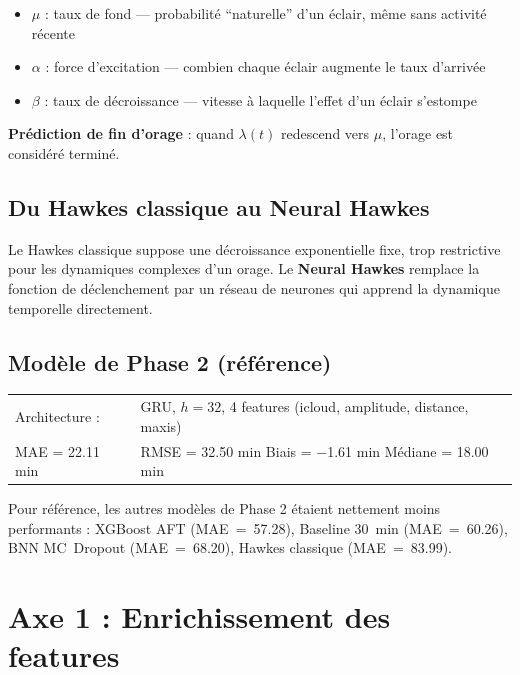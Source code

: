 \documentclass[11pt,a4paper]{article}
\newenvironment{keybox}[1]
  {\begin{tcolorbox}[colback=meteoGray,colframe=meteoBlue,title={\textbf{#1}},
    fonttitle=\small, boxrule=0.6pt, arc=3pt]}
  {\end{tcolorbox}}
\begin{document}
\begin{itemize}[nosep]
  \item $\mu$ : taux de fond — probabilité ``naturelle'' d'un éclair, même sans activité récente
  \item $\alpha$ : force d'excitation — combien chaque éclair augmente le taux d'arrivée
  \item $\beta$ : taux de décroissance — vitesse à laquelle l'effet d'un éclair s'estompe
\end{itemize}

\textbf{Prédiction de fin d'orage} : quand $\lambda(t)$ redescend vers $\mu$, l'orage est considéré terminé.

\subsection{Du Hawkes classique au Neural Hawkes}

Le Hawkes classique suppose une décroissance exponentielle fixe, trop restrictive pour les dynamiques complexes d'un orage. Le \textbf{Neural Hawkes} remplace la fonction de déclenchement par un réseau de neurones qui apprend la dynamique temporelle directement.

\subsection{Modèle de Phase 2 (référence)}

\begin{keybox}{Performance Phase 2 — GRU v1}
\begin{tabular}{@{}ll@{}}
Architecture : & GRU, $h=32$, 4 features (icloud, amplitude, distance, maxis) \\
MAE = 22.11 min & RMSE = 32.50 min \quad Biais = $-$1.61 min \quad Médiane = 18.00 min
\end{tabular}
\end{keybox}

\noindent Pour référence, les autres modèles de Phase 2 étaient nettement moins performants : XGBoost AFT (MAE~=~57.28), Baseline 30~min (MAE~=~60.26), BNN MC~Dropout (MAE~=~68.20), Hawkes classique (MAE~=~83.99).


\section{Axe 1 : Enrichissement des features}
\end{document}
